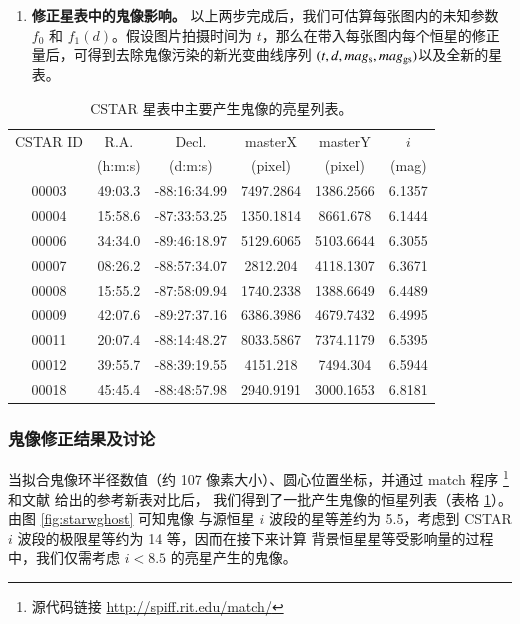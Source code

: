 \begin{enumerate}[leftmargin=1\parindent]
\item \textbf{修正星表中的鬼像影响。} 以上两步完成后，我们可估算每张图内的未知参数 $f_0$ 和 $f_1(d)$。假设图片拍摄时间为 $t$，那么在带入每张图内每个恒星的修正量后，可得到去除鬼像污染的新光变曲线序列 $(t, d, mag_{\mathrm{s}}, mag_{\mathrm{gs}})$以及全新的星表。

\end{enumerate}

\begin{table}[ht]
\centering
\caption{CSTAR 星表中主要产生鬼像的亮星列表。} 
\label{tbl:ghostsource}
\begin{tabular}{cccccc}%
\hline \hline
CSTAR ID	&    R.A.   &   Decl.  	       &    masterX    &   masterY    &    $i$          \\ 
	        	&  (h:m:s) & (d:m:s) 	       &      (pixel)      &     (pixel)      &  (mag)       \\ \hline
00003   	& 49:03.3 & -88:16:34.99 & 7497.2864   & 1386.2566   & 6.1357  	\\
00004   	& 15:58.6 & -87:33:53.25 & 1350.1814   & 8661.678     & 6.1444  	\\
00006   	& 34:34.0 & -89:46:18.97 & 5129.6065   & 5103.6644   & 6.3055  	\\
00007  	& 08:26.2 & -88:57:34.07 & 2812.204     & 4118.1307   & 6.3671  	\\
00008   	& 15:55.2 & -87:58:09.94 & 1740.2338   & 1388.6649   & 6.4489  	\\
00009   	& 42:07.6 & -89:27:37.16 & 6386.3986   & 4679.7432   & 6.4995  	\\
00011  	& 20:07.4 & -88:14:48.27 & 8033.5867   & 7374.1179   & 6.5395  	\\
00012  	& 39:55.7 & -88:39:19.55 & 4151.218     & 7494.304     & 6.5944  	\\
00018  	& 45:45.4 & -88:48:57.98 & 2940.9191   & 3000.1653   & 6.8181  	\\
\hline \hline
\end{tabular}
\end{table}

\subsubsection{鬼像修正结果及讨论}

当拟合鬼像环半径数值（约 107 像素大小）、圆心位置坐标，并通过 match 程序
\footnote{源代码链接 \url{http://spiff.rit.edu/match/}}和文献  给出的参考新表对比后，
我们得到了一批产生鬼像的恒星列表（表格 \ref{tbl:ghostsource}）。由图 \ref{fig:starwghost} 可知鬼像
与源恒星 $i$ 波段的星等差约为 5.5，考虑到 CSTAR $i$ 波段的极限星等约为 14 等，因而在接下来计算
背景恒星星等受影响量的过程中，我们仅需考虑 $i < 8.5$ 的亮星产生的鬼像。

